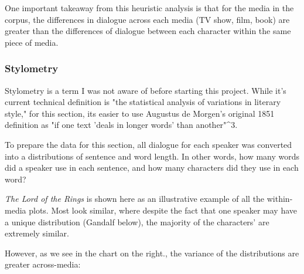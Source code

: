 \documentclass{article}
\begin{document}
\begin{titlepage}
One important takeaway from this heuristic analysis is that for the media in the corpus, the differences in dialogue across each media (TV show, film, book) are greater than the differences of dialogue between each character within the same piece of media.

\subsubsection{Stylometry}

Stylometry is a term I was not aware of before starting this project. While it's current technical definition is "the statistical analysis of variations in literary style," for this section, its easier to use Augustus de Morgen's original 1851 definition as "if one text 'deals in longer words' than another"^3.

To prepare the data for this section, all dialogue for each speaker was converted into a distributions of sentence and word length. In other words, how many words did a speaker use in each sentence, and how many characters did they use in each word?

\textit{The Lord of the Rings} is shown here as an illustrative example of all the within-media plots. Most look similar, where despite the fact that one speaker may have a unique distribution (Gandalf below), the majority of the characters' are extremely similar.

However, as we see in the chart on the right., the variance of the distributions are greater across-media:


\end{titlepage}
\end{document}
